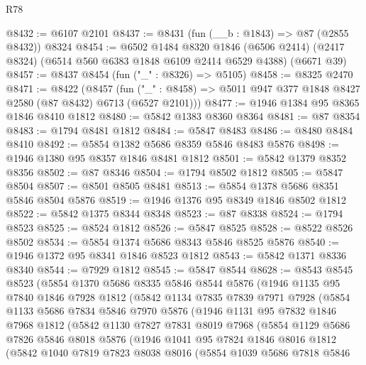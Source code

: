 \begin{lexlean}{R78}
\begin{coremodule}
@8432 := @6107 @2101
@8437 := @8431 (fun (__b : @1843) => @87 (@2855 @8432)) @8324
@8454 := @6502
    @1484
    @8320
    @1846
    (@6506 @2414)
    (@2417 @8324)
    (@6514 @560 @6383 @1848 @6109 @2414 @6529 @4388)
    (@6671 @39)
@8457 := @8437 @8454 (fun ("_" : @8326) => @5105)
@8458 := @8325 @2470
@8471 := @8422
    (@8457 (fun ("_" : @8458) => @5011 @947 @377 @1848 @8427 @2580 (@87 @8432) @6713 (@6527 @2101)))
@8477 := @1946 @1384 @95 @8365 @1846 @8410 @1812
@8480 := @5842 @1383 @8360 @8364
@8481 := @87 @8354
@8483 := @1794 @8481 @1812
@8484 := @5847 @8483
@8486 := @8480 @8484 @8410
@8492 := @5854 @1382 @5686 @8359 @5846 @8483 @5876
@8498 := @1946 @1380 @95 @8357 @1846 @8481 @1812
@8501 := @5842 @1379 @8352 @8356
@8502 := @87 @8346
@8504 := @1794 @8502 @1812
@8505 := @5847 @8504
@8507 := @8501 @8505 @8481
@8513 := @5854 @1378 @5686 @8351 @5846 @8504 @5876
@8519 := @1946 @1376 @95 @8349 @1846 @8502 @1812
@8522 := @5842 @1375 @8344 @8348
@8523 := @87 @8338
@8524 := @1794 @8523
@8525 := @8524 @1812
@8526 := @5847 @8525
@8528 := @8522 @8526 @8502
@8534 := @5854 @1374 @5686 @8343 @5846 @8525 @5876
@8540 := @1946 @1372 @95 @8341 @1846 @8523 @1812
@8543 := @5842 @1371 @8336 @8340
@8544 := @7929 @1812
@8545 := @5847 @8544
@8628 := @8543
    @8545
    @8523
    (@5854
      @1370
      @5686
      @8335
      @5846
      @8544
      @5876
      (@1946
        @1135
        @95
        @7840
        @1846
        @7928
        @1812
        (@5842
          @1134
          @7835
          @7839
          @7971
          @7928
          (@5854
            @1133
            @5686
            @7834
            @5846
            @7970
            @5876
            (@1946
              @1131
              @95
              @7832
              @1846
              @7968
              @1812
              (@5842
                @1130
                @7827
                @7831
                @8019
                @7968
                (@5854
                  @1129
                  @5686
                  @7826
                  @5846
                  @8018
                  @5876
                  (@1946
                    @1041
                    @95
                    @7824
                    @1846
                    @8016
                    @1812
                    (@5842
                      @1040
                      @7819
                      @7823
                      @8038
                      @8016
                      (@5854
                        @1039
                        @5686
                        @7818
                        @5846

\end{coremodule}
\end{lexlean}
